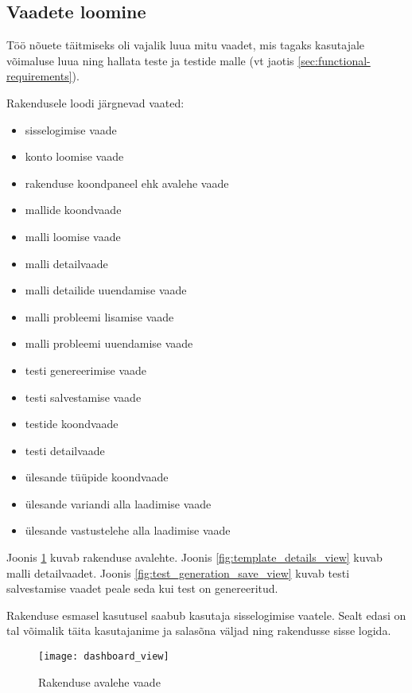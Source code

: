 \subsection{Vaadete loomine}

Töö nõuete täitmiseks oli vajalik luua mitu vaadet, mis tagaks kasutajale võimaluse luua ning hallata teste ja testide malle (vt jaotis \ref{sec:functional-requirements}).

Rakendusele loodi järgnevad vaated:
\begin{itemize}
  \item sisselogimise vaade
  \item konto loomise vaade
  \item rakenduse koondpaneel ehk avalehe vaade
  \item mallide koondvaade
  \item malli loomise vaade
  \item malli detailvaade
  \item malli detailide uuendamise vaade
  \item malli probleemi lisamise vaade
  \item malli probleemi uuendamise vaade
  \item testi genereerimise vaade
  \item testi salvestamise vaade
  \item testide koondvaade
  \item testi detailvaade
  \item ülesande tüüpide koondvaade
  \item ülesande variandi alla laadimise vaade
  \item ülesande vastustelehe alla laadimise vaade
\end{itemize}

Joonis \ref{fig:dashboard_view} kuvab rakenduse avalehte. Joonis \ref{fig:template_details_view} kuvab malli detailvaadet. Joonis \ref{fig:test_generation_save_view} kuvab testi salvestamise vaadet peale seda kui test on genereeritud.

Rakenduse esmasel kasutusel saabub kasutaja sisselogimise vaatele. Sealt edasi on tal võimalik täita kasutajanime ja salasõna väljad ning rakendusse sisse logida.

\begin{figure}[H]
    \centering
    \texttt{[image: dashboard\_view]}
    \caption{Rakenduse avalehe vaade}
    \label{fig:dashboard_view}
\end{figure}

